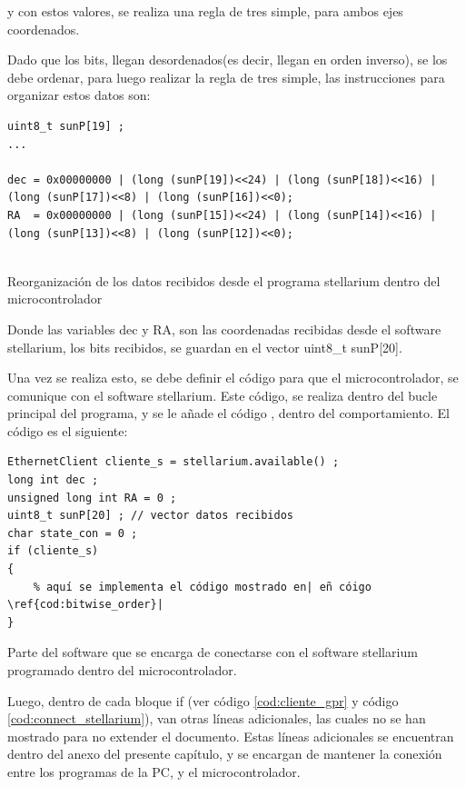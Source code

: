 y con estos valores, se realiza una regla de tres simple, para ambos ejes coordenados. 

Dado que los bits, llegan desordenados(es decir, llegan en orden inverso), se los debe ordenar, para luego realizar la regla de tres simple, las instrucciones para organizar estos datos son: 

\begin{listing}[ht]
\begin{verbatim}
uint8_t sunP[19] ; 
... 

dec = 0x00000000 | (long (sunP[19])<<24) | (long (sunP[18])<<16) | (long (sunP[17])<<8) | (long (sunP[16])<<0);
RA  = 0x00000000 | (long (sunP[15])<<24) | (long (sunP[14])<<16) | (long (sunP[13])<<8) | (long (sunP[12])<<0);
 	
\end{verbatim}
\caption{Reorganización de los datos recibidos desde el programa stellarium dentro del microcontrolador}
\label{cod:bitwise_order}
\end{listing}

Donde las variables dec y RA, son las coordenadas recibidas desde el software stellarium, los bits recibidos, se guardan en el vector uint8\_t sunP[20].

Una vez se realiza esto, se debe definir el código para que el microcontrolador, se comunique con el software stellarium. Este código, se realiza dentro del bucle principal del programa, y se le añade el código \label{cod:bitwise_order}, dentro del comportamiento. El código es el siguiente: 

\begin{listing}
	\begin{verbatim}
EthernetClient cliente_s = stellarium.available() ; 
long int dec ; 
unsigned long int RA = 0 ; 
uint8_t sunP[20] ; // vector datos recibidos 
char state_con = 0 ; 
if (cliente_s)
{
	% aquí se implementa el código mostrado en| eñ cóigo \ref{cod:bitwise_order}|   
}
	\end{verbatim}
\caption{Parte del software que se encarga de conectarse con el software stellarium programado dentro del microcontrolador.}
\label{cod:connect_stellarium}
\end{listing} 

Luego, dentro de cada bloque if (ver código \ref{cod:cliente_gpr} y código \ref{cod:connect_stellarium}), van otras líneas adicionales, las cuales no se han mostrado para no extender el documento. Estas líneas adicionales se encuentran dentro del anexo del presente capítulo, y se encargan de mantener la conexión entre los programas de la PC, y el microcontrolador. 
   

